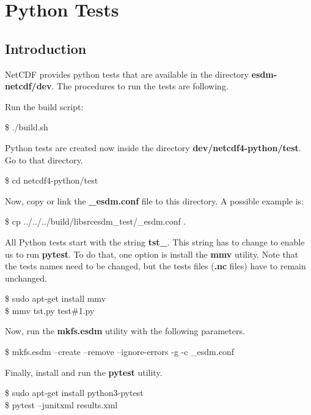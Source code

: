\chapter{Python Tests}
\label{ch:python}

\section{Introduction}

\tab
NetCDF provides python tests that are available in the directory \textbf{esdm-netcdf/dev}. The procedures to run the tests are following.

Run the build script:

\begin{framed}
\$ ./build.sh
\end{framed}

Python tests are created now inside the directory \textbf{dev/netcdf4-python/test}. Go to that directory.

\begin{framed}
\$ cd netcdf4-python/test
\end{framed}

Now, copy or link the \textbf{\_esdm.conf} file to this directory. A possible example is:

\begin{framed}
\$ cp ../../../build/libsrcesdm\_test/\_esdm.conf .
\end{framed}

All Python tests start with the string \textbf{tst\_}. This string has to change to enable us to run \textbf{pytest}. To do that, one option is install the \textbf{mmv} utility. Note that the tests names need to be changed, but the tests files (\textbf{.nc} files) have to remain unchanged.

\begin{framed}
\$ sudo apt-get install mmv\\
\$ mmv tst\*.py test\#1.py
\end{framed}

Now, run the \textbf{mkfs.esdm} utility with the following parameters.

\begin{framed}
\$ mkfs.esdm --create --remove --ignore-errors -g -c \_esdm.conf
\end{framed}

Finally, install and run the \textbf{pytest} utility.

\begin{framed}
\$ sudo apt-get install python3-pytest \\
\$ pytest --junitxml results.xml
\end{framed}

